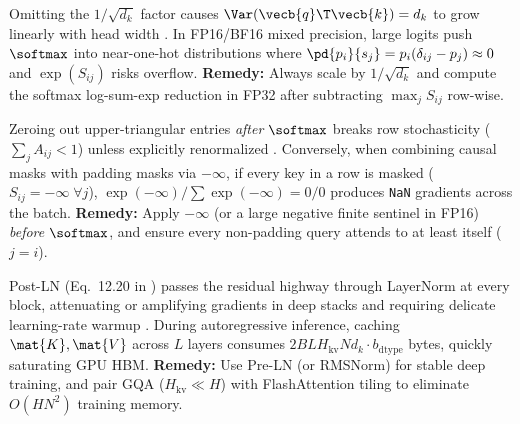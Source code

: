 \documentclass[../../../../master.tex]{subfiles}
\begin{document}
\begin{pitfall}
Omitting the $1/\sqrt{d_k}$ factor causes $\Var(\vecb{q}\T\vecb{k}) = d_k$ to grow linearly with head width  . In FP16/BF16 mixed precision, large logits push $\softmax$ into near-one-hot distributions where $\pd{p_i}{s_j} = p_i(\delta_{ij} - p_j) \approx 0$ and $\exp(S_{ij})$ risks overflow. \textbf{Remedy:} Always scale by $1/\sqrt{d_k}$ and compute the softmax log-sum-exp reduction in FP32 after subtracting $\max_j S_{ij}$ row-wise.
\end{pitfall}

\begin{pitfall}
Zeroing out upper-triangular entries \emph{after} $\softmax$ breaks row stochasticity ($\sum_j A_{ij} < 1$) unless explicitly renormalized . Conversely, when combining causal masks with padding masks via $-\infty$, if every key in a row is masked ($S_{ij} = -\infty \;\forall j$), $\exp(-\infty)/\sum \exp(-\infty) = 0/0$ produces \texttt{NaN} gradients across the batch. \textbf{Remedy:} Apply $-\infty$ (or a large negative finite sentinel in FP16) \emph{before} $\softmax$, and ensure every non-padding query attends to at least itself ($j=i$).
\end{pitfall}

\begin{pitfall}
Post-LN (Eq.~12.20 in ) passes the residual highway through LayerNorm at every block, attenuating or amplifying gradients in deep stacks and requiring delicate learning-rate warmup . During autoregressive inference, caching $\mat{K}, \mat{V}$ across $L$ layers consumes $2 B L H_{\mathrm{kv}} N d_k \cdot b_{\mathrm{dtype}}$ bytes, quickly saturating GPU HBM. \textbf{Remedy:} Use Pre-LN (or RMSNorm) for stable deep training, and pair GQA ($H_{\mathrm{kv}} \ll H$) with FlashAttention tiling to eliminate $O(H N^2)$ training memory.
\end{pitfall}
\end{document}
